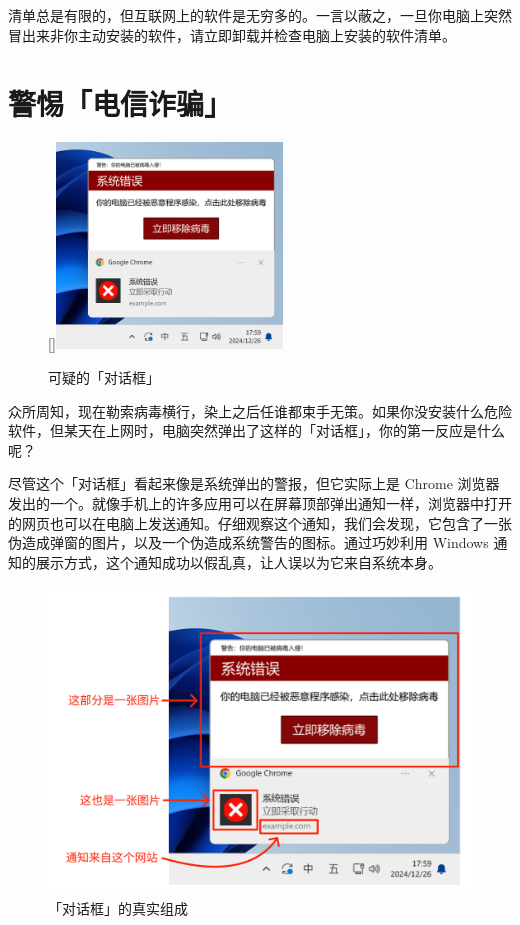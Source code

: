 清单总是有限的，但互联网上的软件是无穷多的。一言以蔽之，一旦你电脑上突然冒出来非你主动安装的软件，请立即卸载并检查电脑上安装的软件清单。

\section{警惕「电信诈骗」}

\begin{figure}
  \centering
  \raisebox{0pt}[\dimexpr{}\baselineskip\relax]{\includegraphics[width=6cm]{assets/basic/Fake_anti_virus_notification.png}}
  \caption{可疑的「对话框」}
  \label{fig:Fake_anti_virus_notification}
\end{figure}

众所周知，现在勒索病毒横行，染上之后任谁都束手无策。如果你没安装什么危险软件，但某天在上网时，电脑突然弹出了这样的「对话框」，你的第一反应是什么呢？

尽管这个「对话框」看起来像是系统弹出的警报，但它实际上是 Chrome 浏览器发出的一个。就像手机上的许多应用可以在屏幕顶部弹出通知一样，浏览器中打开的网页也可以在电脑上发送通知。仔细观察这个通知，我们会发现，它包含了一张伪造成弹窗的图片，以及一个伪造成系统警告的图标。通过巧妙利用 Windows 通知的展示方式，这个通知成功以假乱真，让人误以为它来自系统本身。

\begin{figure}[htb!]
  \centering
  \includegraphics[width=.7\textwidth]{assets/basic/Fake_notification_components.png}
  \caption{「对话框」的真实组成}
  \label{fig:Fake_notification_components}
\end{figure}

